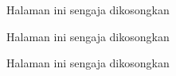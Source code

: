 \documentclass[10pt,a5paper,twoside]{book}
\makeatletter
\def\emptypage@emptypage{%
     \begin{center}
     Halaman ini sengaja dikosongkan
     \end{center}
     \newpage%
}%
\def\cleardoublepage{%
        \clearpage%
        \if@twoside%
            \ifodd\c@page%
            \else%
                \emptypage@emptypage%
            \fi%
        \fi%
}%
\makeatother
\begin{document}
    \title {\judul}
    \author {\penulis}


    \frontmatter
        
         
        
        
        \tableofcontents
            \cleardoublepage
        \listoftables
            \cleardoublepage
        \listoffigures
            \cleardoublepage



    \mainmatter
        
        
        
        
        
        
\end{document}
